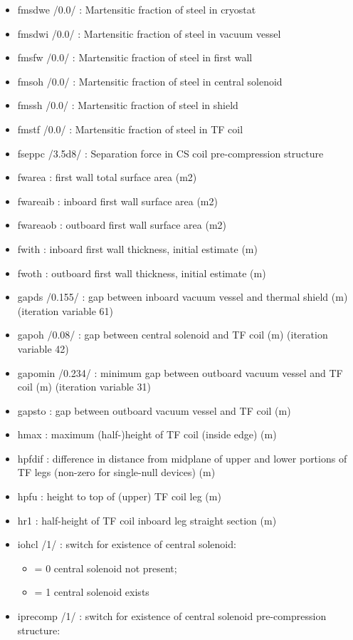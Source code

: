 \documentclass[
]{article}
\providecommand{\tightlist}{%
  \setlength{\itemsep}{0pt}\setlength{\parskip}{0pt}}
\begin{document}
\begin{itemize}
\begin{itemize}
  \item
    fmsdwe /0.0/ : Martensitic fraction of steel in cryostat
  \item
    fmsdwi /0.0/ : Martensitic fraction of steel in vacuum vessel
  \item
    fmsfw /0.0/ : Martensitic fraction of steel in first wall
  \item
    fmsoh /0.0/ : Martensitic fraction of steel in central solenoid
  \item
    fmssh /0.0/ : Martensitic fraction of steel in shield
  \item
    fmstf /0.0/ : Martensitic fraction of steel in TF coil
  \item
    fseppc /3.5d8/ : Separation force in CS coil pre-compression
    structure
  \item
    fwarea : first wall total surface area (m2)
  \item
    fwareaib : inboard first wall surface area (m2)
  \item
    fwareaob : outboard first wall surface area (m2)
  \item
    fwith : inboard first wall thickness, initial estimate (m)
  \item
    fwoth : outboard first wall thickness, initial estimate (m)
  \item
    gapds /0.155/ : gap between inboard vacuum vessel and thermal shield
    (m) (iteration variable 61)
  \item
    gapoh /0.08/ : gap between central solenoid and TF coil (m)
    (iteration variable 42)
  \item
    gapomin /0.234/ : minimum gap between outboard vacuum vessel and TF
    coil (m) (iteration variable 31)
  \item
    gapsto : gap between outboard vacuum vessel and TF coil (m)
  \item
    hmax : maximum (half-)height of TF coil (inside edge) (m)
  \item
    hpfdif : difference in distance from midplane of upper and lower
    portions of TF legs (non-zero for single-null devices) (m)
  \item
    hpfu : height to top of (upper) TF coil leg (m)
  \item
    hr1 : half-height of TF coil inboard leg straight section (m)
  \item
    iohcl /1/ : switch for existence of central solenoid:

    \begin{itemize}
    \tightlist
    \item
      = 0 central solenoid not present;
    \item
      = 1 central solenoid exists
    \end{itemize}
  \item
    iprecomp /1/ : switch for existence of central solenoid
    pre-compression structure:


\end{itemize}
\end{itemize}
\end{document}
